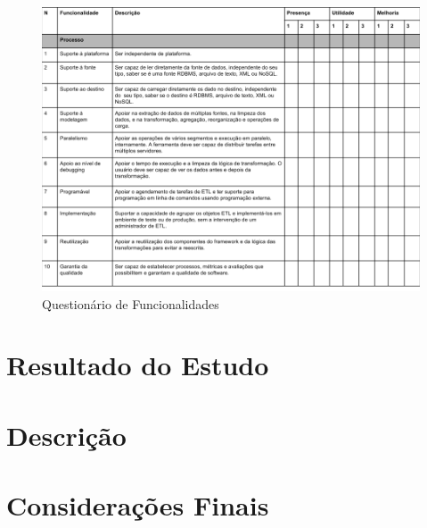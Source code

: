 \begin{figure}[h!]
	\centering
	\includegraphics[scale=0.5]{fig/questionario_caracteristicas.png}
	\caption{Questionário de Funcionalidades}
	\label{questionariofuncionalidades}
\end{figure}

\section{Resultado do Estudo}

\section{Descrição}
\section{Considerações Finais}
